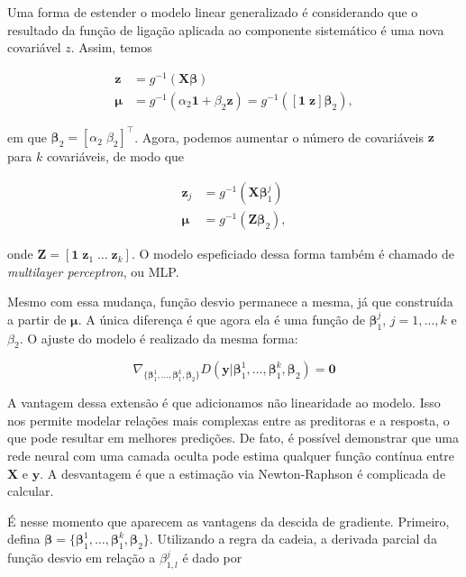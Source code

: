 \documentclass[12pt,]{report}
\begin{document}
Uma forma de estender o modelo linear generalizado é considerando que o resultado da função de ligação aplicada ao componente sistemático é uma nova covariável \(z\). Assim, temos

\[
\begin{aligned}
\mathbf z &= g^{-1}(\mathbf X \boldsymbol \beta)\\
\boldsymbol\mu &= g^{-1}(\alpha_2\mathbf 1 + \beta_2 \mathbf z) = g^{-1}([\mathbf 1\;\mathbf z]\boldsymbol\beta_2),
\end{aligned}
\]

em que \(\boldsymbol\beta_2 = [\alpha_2\;\beta_2]^{\top}\). Agora, podemos aumentar o número de covariáveis \(\mathbf z\) para \(k\) covariáveis, de modo que

\[
\begin{aligned}
\mathbf z_j &= g^{-1}(\mathbf X \boldsymbol \beta_1^j)\\
\boldsymbol\mu &= g^{-1}(\mathbf Z\boldsymbol\beta_2),
\end{aligned}
\]

onde \(\mathbf Z = [\mathbf 1\;\mathbf z_1\;\dots\;\mathbf z_k]\). O modelo espeficiado dessa forma também é chamado de \emph{multilayer perceptron}, ou MLP.

Mesmo com essa mudança, função desvio permanece a mesma, já que construída a partir de \(\boldsymbol \mu\). A única diferença é que agora ela é uma função de \(\boldsymbol \beta_1^j\), \(j=1,\dots,k\) e \(\beta_2\). O ajuste do modelo é realizado da mesma forma:

\[
\nabla_{\{\boldsymbol \beta_1^1, \dots,\boldsymbol \beta_1^k,\boldsymbol \beta_2\}} D(\mathbf y|{ \boldsymbol \beta_1^1, \dots,\boldsymbol \beta_1^k,\boldsymbol \beta_2}) = \mathbf 0
\]

A vantagem dessa extensão é que adicionamos não linearidade ao modelo. Isso nos permite modelar relações mais complexas entre as preditoras e a resposta, o que pode resultar em melhores predições. De fato, é possível demonstrar que uma rede neural com uma camada oculta pode estima qualquer função contínua entre \(\mathbf X\) e \(\mathbf y\). A desvantagem é que a estimação via Newton-Raphson é complicada de calcular.

É nesse momento que aparecem as vantagens da descida de gradiente. Primeiro, defina \(\boldsymbol \beta = \{\boldsymbol \beta_1^1, \dots,\boldsymbol \beta_1^k,\boldsymbol \beta_2\}\). Utilizando a regra da cadeia, a derivada parcial da função desvio em relação a \(\beta_{1,l}^{j}\) é dado por
\end{document}
